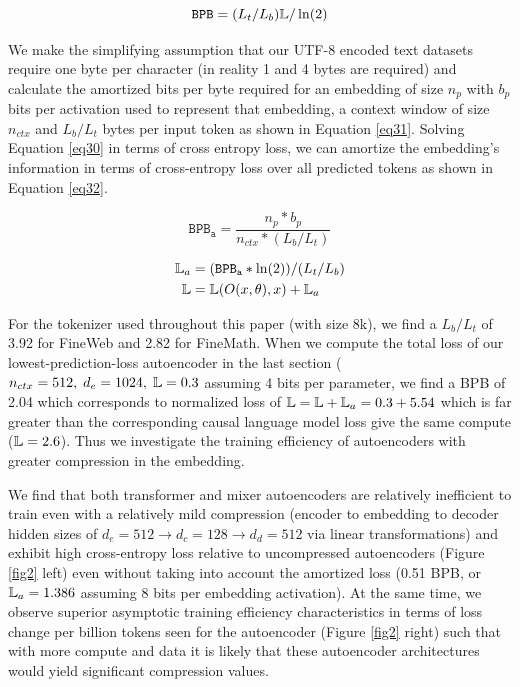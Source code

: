 \documentclass{article}
\begin{document}
    \begin{equation}
        \mathtt{BPB} = (L_t / L_b) \Bbb L  /\ln(2)
        \label{eq30}
    \end{equation}

    We make the simplifying assumption that our UTF-8 encoded text datasets require one byte per character (in reality 1 and 4 bytes are required) and calculate the amortized bits per byte required for an embedding of size $n_p$ with $b_p$ bits per activation used to represent that embedding, a context window of size $n_{ctx}$ and $L_b / L_t$ bytes per input token as shown in Equation \ref{eq31}. Solving Equation \ref{eq30} in terms of cross entropy loss, we can amortize the embedding's information in terms of cross-entropy loss over all predicted tokens as shown in Equation \ref{eq32}.

    \begin{equation}
         \mathtt{BPB_a} = \frac{n_p * b_p}{n_{ctx} * (L_b / L_t)}
         \label{eq31}
    \end{equation}

    \begin{equation}
        \begin{split}
         \Bbb L_a &= (\mathtt{BPB_a} * \ln(2))/(L_t / L_b) \\
         \Bbb L &= \Bbb L(O(x, \theta), x) + \Bbb L_a
        \end{split}
    \label{eq32}
    \end{equation}

    For the tokenizer used throughout this paper (with size 8k), we find a $L_b / L_t$ of 3.92 for FineWeb and 2.82 for FineMath. When we compute the total loss of our lowest-prediction-loss autoencoder in the last section ($n_{ctx}=512, \; d_e = 1024, \; \Bbb L=0.3$ assuming 4 bits per parameter, we find a BPB of 2.04 which corresponds to normalized loss of $\Bbb L = \Bbb L + \Bbb L_a =  0.3 + 5.54$ which is far greater than the corresponding causal language model loss give the same compute ($\Bbb L = 2.6$). Thus we investigate the training efficiency of autoencoders with greater compression in the embedding.
    
    We find that both transformer and mixer autoencoders are relatively inefficient to train even with a relatively mild compression (encoder to embedding to decoder hidden sizes of $d_e=512 \to d_c = 128 \to d_d=512$ via linear transformations) and exhibit high cross-entropy loss relative to uncompressed autoencoders (Figure \ref{fig2} left) even without taking into account the amortized loss (0.51 BPB, or $\Bbb L_a = 1.386$ assuming 8 bits per embedding activation). At the same time, we observe superior asymptotic training efficiency characteristics in terms of loss change per billion tokens seen for the autoencoder (Figure \ref{fig2} right) such that with more compute and data it is likely that these autoencoder architectures would yield significant compression values.
    
\end{document}
